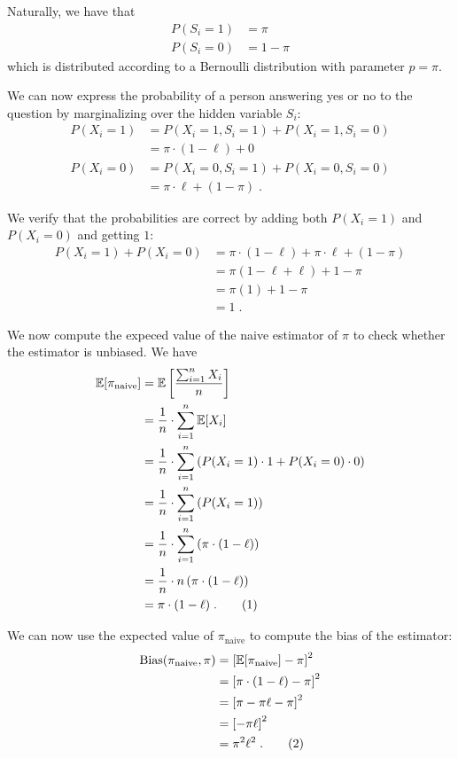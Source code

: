 \documentclass{article}
\newcommand{\stepandtag}{%
  \refstepcounter{equation}%
  \tag{\theequation}%
}
\begin{document}
Naturally, we have that 
\begin{align*}
    P(S_i = 1) &= \pi \\
    P(S_i = 0) &= 1 - \pi
\end{align*}
which is distributed according to a Bernoulli distribution with parameter $p=\pi$.

We can now express the probability of a person answering yes or no to the question by marginalizing over the hidden variable $S_i$:
\begin{align*}
    P(X_i = 1) &= P(X_i = 1, S_i = 1) + P(X_i = 1, S_i = 0) \\
    &= \pi \cdot (1-\ell) + 0 \\
    P(X_i = 0) &= P(X_i = 0, S_i = 1) + P(X_i = 0, S_i = 0) \\
    &= \pi \cdot \ell + (1-\pi)\;.
\end{align*}

We verify that the probabilities are correct by adding both $P(X_i = 1)$ and $P(X_i = 0)$ and getting $1$:
\begin{align*}
    P(X_i = 1) + P(X_i = 0) &= \pi \cdot (1-\ell) + \pi \cdot \ell + (1-\pi) \\
    &= \pi (1-\ell + \ell) + 1- \pi \\
    &= \pi (1) + 1- \pi \\
    &= 1\;.
\end{align*}

We now compute the expeced value of the naive estimator of $\pi$ to check whether the estimator is unbiased.
We have
\begin{align*}
    \mathbb{E}[\pi_\text{naive}] &= \mathbb{E}\left[ \frac{\sum_{i=1}^{n} X_i}{n} \right] \\
    &= \frac{1}{n} \cdot \sum_{i=1}^{n} \mathbb{E}[X_i] \\
    &= \frac{1}{n} \cdot \sum_{i=1}^{n} \left( P(X_i = 1) \cdot 1 + P(X_i = 0) \cdot 0 \right) \\
    &= \frac{1}{n} \cdot \sum_{i=1}^{n} \left( P(X_i = 1) \right) \\
    &= \frac{1}{n} \cdot \sum_{i=1}^{n} \left( \pi \cdot (1-\ell) \right) \\
    &= \frac{1}{n} \cdot n \left( \pi \cdot (1-\ell) \right) \\
    &= \pi \cdot (1-\ell)\;. \stepandtag \label{eq:naive_expected_value}
\end{align*}

We can now use the expected value of $\pi_{\text{naive}}$ to compute the bias of the estimator:
\begin{align*}
    \text{Bias}(\pi_{\text{naive}}, \pi) &= {\left[ \mathbb{E}[\pi_{\text{naive}}] - \pi \right]}^2 \\
    &= {\left[ \pi \cdot (1-\ell) - \pi \right]}^2 \\
    &= {\left[ \pi - \pi \ell - \pi \right]}^2 \\
    &= {\left[ - \pi \ell \right]}^2 \\
    &= \pi^2 \ell^2\;. \stepandtag \label{eq:bias_naive}
\end{align*}
\end{document}
